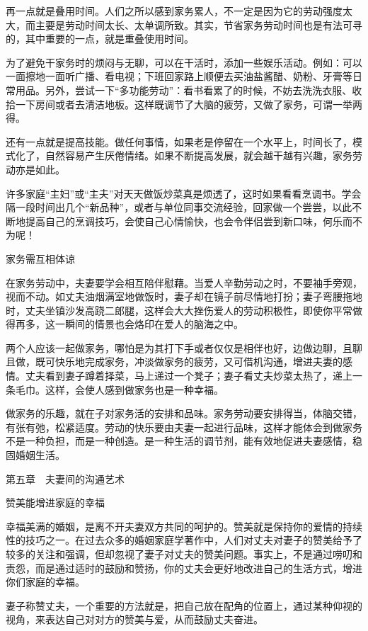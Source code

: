 \documentclass[12pt,UTF8]{ctexbook}
\begin{document}
再一点就是叠用时间。人们之所以感到家务累人，不一定是因为它的劳动强度太大，而主要是劳动时间太长、太单调所致。其实，节省家务劳动时间也是有法可寻的，其中重要的一点，就是重叠使用时间。

为了避免干家务时的烦闷与无聊，可以在干活时，添加一些娱乐活动。例如：可以一面擦地一面听广播、看电视；下班回家路上顺便去买油盐酱醋、奶粉、牙膏等日常用品。另外，尝试一下“多功能劳动”：看书看累了的时候，不妨去洗洗衣服、收拾一下房间或者去清洁地板。这样既调节了大脑的疲劳，又做了家务，可谓一举两得。

还有一点就是提高技能。做任何事情，如果老是停留在一个水平上，时间长了，模式化了，自然容易产生厌倦情绪。如果不断提高发展，就会越干越有兴趣，家务劳动亦是如此。

许多家庭“主妇”或“主夫”对天天做饭炒菜真是烦透了，这时如果看看烹调书。学会隔一段时间出几个“新品种”，或者与单位同事交流经验，回家做一个尝尝，以此不断地提高自己的烹调技巧，会使自己心情愉快，也会令伴侣尝到新口味，何乐而不为呢！





家务需互相体谅


在家务劳动中，夫妻要学会相互陪伴慰藉。当爱人辛勤劳动之时，不要袖手旁观，视而不动。如丈夫油烟满室地做饭时，妻子却在镜子前尽情地打扮；妻子弯腰拖地时，丈夫坐镇沙发高跷二郎腿，这样会大大挫伤爱人的劳动积极性，即使你平常做得再多，这一瞬间的情景也会烙印在爱人的脑海之中。

两个人应该一起做家务，哪怕是为其打下手或者仅仅是相伴也好，边做边聊，且聊且做，既可快乐地完成家务，冲淡做家务的疲劳，又可借机沟通，增进夫妻的感情。丈夫看到妻子蹲着择菜，马上递过一个凳子；妻子看丈夫炒菜太热了，递上一条毛巾。这样，会使人感到做家务也是一种幸福。

做家务的乐趣，就在子对家务活的安排和品味。家务劳动要安排得当，体脑交错，有张有弛，松紧适度。劳动的快乐要由夫妻一起进行品味，这样才能体会到做家务不是一种负担，而是一种创造。是一种生活的调节剂，能有效地促进夫妻感情，稳固婚姻生活。





第五章　夫妻间的沟通艺术


赞美能增进家庭的幸福


幸福美满的婚姻，是离不开夫妻双方共同的呵护的。赞美就是保持你的爱情的持续性的技巧之一。在过去众多的婚姻家庭学著作中，人们对丈夫对妻子的赞美给予了较多的关注和强调，但却忽视了妻子对丈夫的赞美问题。事实上，不是通过唠叨和责怨，而是通过适时的鼓励和赞扬，你的丈夫会更好地改进自己的生活方式，增进你们家庭的幸福。

妻子称赞丈夫，一个重要的方法就是，把自己放在配角的位置上，通过某种仰视的视角，来表达自己对对方的赞美与爱，从而鼓励丈夫奋进。
\end{document}
